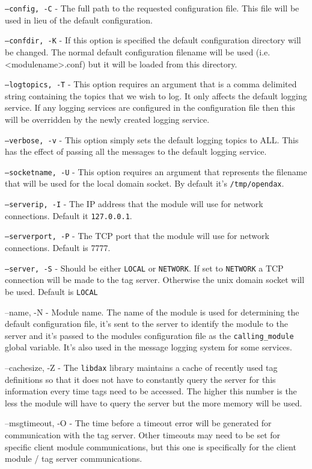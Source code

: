 \begin{list}{}{Command Line Options}
	\item[\texttt{--config, -C}] - The full path to the requested configuration file.  This file will be used in lieu of the default configuration.
	\item[\texttt{--confdir, -K}] - If this option is specified the default configuration directory will be changed.  The normal default configuration filename will be used (i.e. <modulename>.conf) but it will be loaded from this directory.
	\item[\texttt{--logtopics, -T}] - This option requires an argument that is a comma delimited string containing the topics that we wish to log.  It only affects the default logging service.  If any logging services are configured in the configuration file then this will be overridden by the newly created logging service.
	\item[\texttt{--verbose, -v}] - This option simply sets the default logging topics to ALL.  This has the effect of passing all the messages to the default logging service.
	\item[\texttt{--socketname, -U}] - This option requires an argument that represents the filename that will be used for the local domain socket.  By default it's \texttt{/tmp/opendax}.
	\item[\texttt{--serverip, -I}] - The IP address that the module will use for network connections.  Default it \texttt{127.0.0.1}.
	\item[\texttt{--serverport, -P}] - The TCP port that the module will use for network connections.  Default is 7777.
	\item[\texttt{--server, -S}] - Should be either \texttt{LOCAL} or \texttt{NETWORK}.  If set to \texttt{NETWORK} a TCP connection will be made to the tag server.  Otherwise the unix domain socket will be used.  Default is \texttt{LOCAL}
	\item[--name, -N] - Module name.  The name of the module is used for determining the default configuration file, it's sent to the server to identify the module to the server and it's passed to the modules configuration file as the \texttt{calling\_module} global variable.  It's also used in the message logging system for some services.
	\item[--cachesize, -Z] - The \texttt{libdax} library maintains a cache of recently used tag definitions so that it does not have to constantly query the server for this information every time tags need to be accessed.  The higher this number is the less the module will have to query the server but the more memory will be used.
	\item[--msgtimeout, -O] - The time before a timeout error will be generated for communication with the tag server.  Other timeouts may need to be set for specific client module communications, but this one is specifically for the client module / tag server communications.
\end{list}

